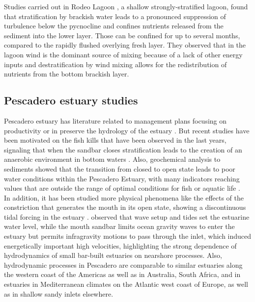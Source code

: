 \documentclass[tesis.tex]{subfiles}
\begin{document}
Studies carried out in Rodeo Lagoon \citep{Cousins2010}, a shallow strongly-stratified lagoon, found that stratification by brackish water leads to a pronounced suppression of turbulence below the pycnocline and confines nutrients released from the sediment into the lower layer. Those can be confined for up to several months, compared to the rapidly flushed overlying fresh layer. They observed that in the lagoon wind is the dominant source of mixing because of a lack of other energy inputs and destratification by wind mixing allows for the redistribution of nutrients from the bottom brackish layer.\\

\subsection{Pescadero estuary studies}

Pescadero estuary has literature related to management plans focusing on productivity \citep{curry1985pescadero} or in preserve the hydrology of the estuary \citep{williams1990pescadero}. But recent studies have been motivated on the fish kills that have been observed in the last years, signaling that when the sandbar closes stratification leads to the creation of an anaerobic environment in bottom waters \citep{sloan2006ecological}. Also, geochemical analysis to sediments showed that the transition from closed to open state leads to poor water conditions within the Pescadero Estuary, with many indicators reaching values that are outside the range of optimal conditions for fish or aquatic life \citep{richards2018}. \\

In addition, it has been studied more physical phenomena like the effects of the constriction that generates the mouth in its open state, showing a discontinuous tidal forcing in the estuary \citep{williams2016}. \cite{williams2016} observed that wave setup and tides set the estuarine water level, while the mouth sandbar limits ocean gravity waves to enter the estuary but permits infragravity motions to pass through the inlet, which induced energetically important high velocities, highlighting the strong dependence of hydrodynamics of small bar-built estuaries on nearshore processes. Also, hydrodynamic processes in Pescadero are comparable to similar estuaries along the western coast of the Americas as well as in Australia, South Africa, and in estuaries in Mediterranean climates on the Atlantic west coast of Europe, as well as in shallow sandy inlets elsewhere.\\
\end{document}
